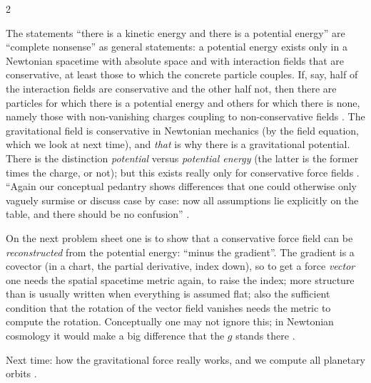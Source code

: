 \begin{paracol}{2}
\begin{coursenote}\label{cn:nd-nopot}
The statements ``there is a kinetic energy and there is a potential energy'' are ``complete nonsense'' as general statements: a potential energy exists only in a Newtonian spacetime with absolute space and with interaction fields that are conservative, at least those to which the concrete particle couples. If, say, half of the interaction fields are conservative and
the other half not, then there are particles for which there is a potential energy and others for which there is none, namely those with non-vanishing charges coupling to non-conservative fields . The gravitational field is conservative in Newtonian mechanics (by the field equation, which we look at next time), and \emph{that} is why there is a gravitational potential.
There is the distinction \emph{potential} versus \emph{potential energy} (the latter is the former times the charge, or not); but this exists really only for conservative force fields . ``Again our conceptual pedantry shows differences that one could otherwise only vaguely surmise or discuss case by case: now all assumptions lie explicitly on the table, and there should be no confusion'' .
\end{coursenote}
\begin{exercise}\label{ex:nd-grad}
On the next problem sheet one is to show that a conservative force field can be \emph{reconstructed} from the potential energy: ``minus the gradient''. The gradient is a covector (in a chart, the partial derivative, index down), so to get a force \emph{vector} one needs the spatial spacetime metric again, to raise the index; more structure than is usually written when everything is assumed flat; also the sufficient condition that
the rotation of the vector field vanishes needs the metric to compute the rotation. Conceptually one may not ignore this; in Newtonian cosmology it would make a big difference that the $g$ stands there .
\end{exercise}
Next time: how the gravitational force really works, and we compute all planetary orbits .


\end{paracol}
